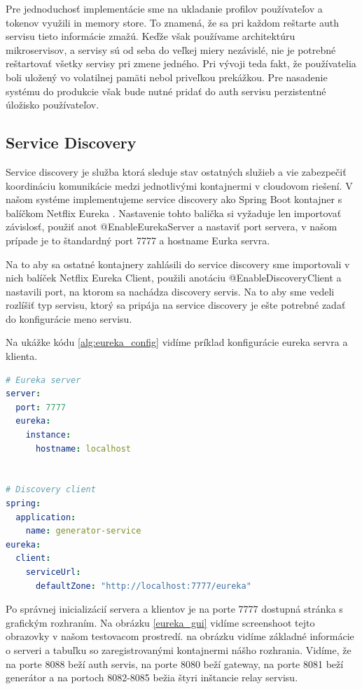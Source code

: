 Pre jednoduchosť implementácie sme na ukladanie profilov používateľov a tokenov využili in memory store. To znamená, že sa pri každom reštarte auth servisu tieto informácie zmažú. Keďže však používame architektúru mikroservisov, a servisy sú od seba do veľkej miery nezávislé, nie je potrebné reštartovať všetky servisy pri zmene jedného. Pri vývoji teda fakt, že používatelia boli uložený vo volatilnej pamäti nebol priveľkou prekážkou. Pre nasadenie systému do produkcie však bude nutné pridať do auth servisu perzistentné úložisko používateľov.


\subsection{Service Discovery}
Service discovery je služba ktorá sleduje stav ostatných služieb a vie zabezpečiť koordináciu komunikácie medzi jednotlivými kontajnermi v cloudovom riešení. V našom systéme implementujeme service discovery ako Spring Boot kontajner s balíčkom Netflix Eureka \cite{eureka}. Nastavenie tohto balička si vyžaduje len importovať závislosť, použiť anot @EnableEurekaServer a nastaviť port servera, v našom prípade je to štandardný port 7777 a hostname Eurka servra.

Na to aby sa ostatné kontajnery zahlásili do service discovery sme importovali v nich balíček Netflix Eureka Client, použili anotáciu @EnableDiscoveryClient a nastavili port, na ktorom sa nachádza discovery servis. Na to aby sme vedeli rozlíšiť typ servisu, ktorý sa pripája na service discovery je ešte potrebné zadať do konfigurácie meno servisu.

Na ukážke kódu \ref{alg:eureka_config} vidíme príklad konfigurácie eureka servra a klienta.

\begin{lstlisting}[float, caption={Konfigurácia Eureka servra a klienta},label={alg:eureka_config},language=yaml]
# Eureka server
server:
  port: 7777
  eureka:
	instance:
	  hostname: localhost
			

# Discovery client	
spring:
  application:
	name: generator-service
eureka:
  client:
	serviceUrl:
	  defaultZone: "http://localhost:7777/eureka"
\end{lstlisting}

Po správnej inicializácií servera a klientov je na porte 7777 dostupná stránka s grafickým rozhraním. Na obrázku \ref{eureka_gui} vidíme screenshoot tejto obrazovky v našom testovacom prostredí. na obrázku vidíme základné informácie o serveri a tabuľku so zaregistrovanými kontajnermi nášho rozhrania. Vidíme, že na porte 8088 beží auth servis, na porte 8080 beží gateway, na porte 8081 beží generátor a na portoch 8082-8085 bežia štyri inštancie relay servisu.

